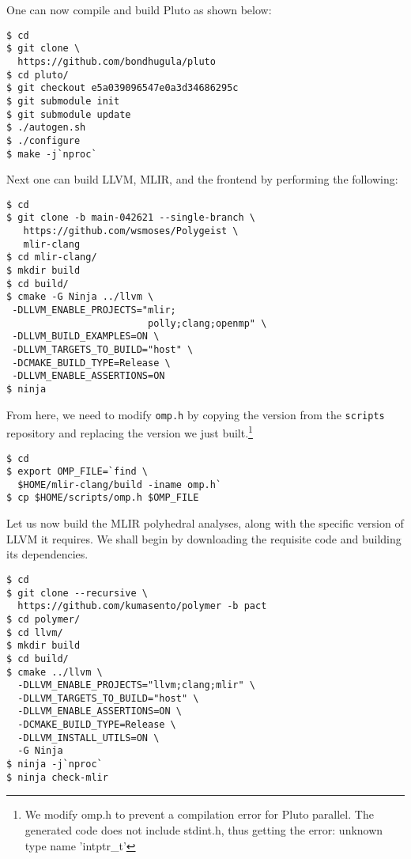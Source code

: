 \noindent One can now compile and build Pluto as shown below:

\begin{small}
\begin{verbatim}
$ cd 
$ git clone \
  https://github.com/bondhugula/pluto
$ cd pluto/
$ git checkout e5a039096547e0a3d34686295c
$ git submodule init
$ git submodule update
$ ./autogen.sh
$ ./configure
$ make -j`nproc`
\end{verbatim}
\end{small}

\noindent Next one can build LLVM, MLIR, and the frontend by performing the following:

\begin{small}
\begin{verbatim}
$ cd
$ git clone -b main-042621 --single-branch \
   https://github.com/wsmoses/Polygeist \
   mlir-clang
$ cd mlir-clang/
$ mkdir build
$ cd build/
$ cmake -G Ninja ../llvm \
 -DLLVM_ENABLE_PROJECTS="mlir;
                         polly;clang;openmp" \
 -DLLVM_BUILD_EXAMPLES=ON \
 -DLLVM_TARGETS_TO_BUILD="host" \
 -DCMAKE_BUILD_TYPE=Release \
 -DLLVM_ENABLE_ASSERTIONS=ON  
$ ninja
\end{verbatim}
\end{small}

\noindent From here, we need to modify \verb|omp.h| by copying the version from the \verb|scripts| repository and replacing the version we just built.\footnote{We modify omp.h to prevent a compilation error for Pluto parallel. The generated code does not include stdint.h, thus getting the error: unknown type name 'intptr\_t'}

\begin{small}
\begin{verbatim}
$ cd
$ export OMP_FILE=`find \
  $HOME/mlir-clang/build -iname omp.h`
$ cp $HOME/scripts/omp.h $OMP_FILE
\end{verbatim}
\end{small}

\noindent Let us now build the MLIR polyhedral analyses, along with the specific version of LLVM it requires. We shall begin by downloading the requisite code and building its dependencies.

\begin{small}
\begin{verbatim}
$ cd
$ git clone --recursive \
  https://github.com/kumasento/polymer -b pact
$ cd polymer/
$ cd llvm/
$ mkdir build
$ cd build/
$ cmake ../llvm \
  -DLLVM_ENABLE_PROJECTS="llvm;clang;mlir" \
  -DLLVM_TARGETS_TO_BUILD="host" \
  -DLLVM_ENABLE_ASSERTIONS=ON \
  -DCMAKE_BUILD_TYPE=Release \
  -DLLVM_INSTALL_UTILS=ON \
  -G Ninja
$ ninja -j`nproc`
$ ninja check-mlir
\end{verbatim}
\end{small}

